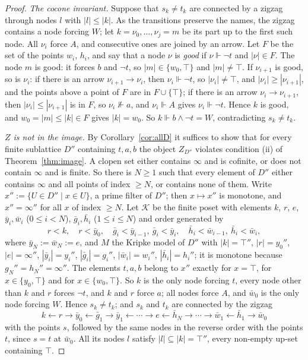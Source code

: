 \documentclass[11pt]{amsart}
\theoremstyle{definition}
\newcommand{\cK}{\mathcal K}
\begin{document}
\begin{proof}
\emph{The cocone invariant.} Suppose that $s_k\ne t_k$ are connected by
a zigzag through nodes $l$ with $|l|\le|k|$. As the transitions
preserve the names, the zigzag contains a node forcing $W$; let
$k=\nu_0,\dots,\nu_j=m$ be its part up to the first such node. All
$\nu_i$ force $A$, and consecutive ones are joined by an arrow. Let
$F$ be the set of the points $w_i$, $h_i$, and say that a node $\nu$
is \emph{good} if $\nu\Vdash\neg t$ and $|\nu|\in F$. The node $m$ is
good: it forces $b$ and $\neg t$, so $|m|\in\{w_0,\top\}$ and
$|m|\ne\top$. If $\nu_{i+1}$ is good, so is $\nu_i$: if there is an
arrow $\nu_{i+1}\to\nu_i$, then $\nu_i\Vdash\neg t$, so $|\nu_i|\ne
\top$, and $|\nu_i|\ge|\nu_{i+1}|$, and the points above a point of $F$
are in $F\cup\{\top\}$; if there is an arrow $\nu_i\to\nu_{i+1}$, then
$|\nu_i|\le|\nu_{i+1}|$ is in $F$, so $\nu_i\nVdash a$, and
$\nu_i\Vdash A$ gives $\nu_i\Vdash\neg t$. Hence $k$ is good, and
$w_0=|m|\le|k|\in F$ gives $|k|=w_0$. So $k\Vdash b\wedge\neg t=W$,
contradicting $s_k\ne t_k$.

\emph{$Z$ is not in the image.} By Corollary~\ref{cor:allD} it
suffices to show that for every finite sublattice $D''$ containing
$t,a,b$ the object $Z_{D''}$ violates condition (ii) of
Theorem~\ref{thm:image}. A clopen set either contains $\infty$ and is
cofinite, or does not contain $\infty$ and is finite. So there is
$N\ge1$ such that every element of $D''$ either contains $\infty$ and
all points of index $\ge N$, or contains none of them. Write
$x'':=\{U\in D''\mid x\in U\}$, a prime filter of $D''$; then
$x\mapsto x''$ is monotone, and $x''=\infty''$ for all $x$ of index
$\ge N$. Let $\cK$ be the finite poset with elements $k$, $r$, $e$,
$\bar y_i,\bar w_i$ ($0\le i<N$), $\bar g_i,\bar h_i$ ($1\le i\le N$)
and order generated by
\[
r<k,\quad r<\bar y_0,\quad\bar g_i<\bar y_{i-1},\ \bar g_i<\bar y_i,
\quad\bar h_i<\bar w_{i-1},\ \bar h_i<\bar w_i,
\]
where $\bar y_N:=\bar w_N:=e$, and $M$ the Kripke model of $D''$ with
$|k|=\top''$, $|r|=y_0''$, $|e|=\infty''$, $|\bar y_i|=y_i''$,
$|\bar g_i|=g_i''$, $|\bar w_i|=w_i''$, $|\bar h_i|=h_i''$; it is
monotone because $g_N''=h_N''=\infty''$. The elements $t,a,b$ belong to
$x''$ exactly for $x=\top$, for $x\in\{y_0,\top\}$ and for
$x\in\{w_0,\top\}$. So $k$ is the only node forcing $t$, every node
other than $k$ and $r$ forces $\neg t$, and $k$ and $r$ force $a$; all
nodes force $A$, and $\bar w_0$ is the only node forcing $W$. Hence
$s_k\ne t_k$; and $s_k$ and $t_k$ are connected by the zigzag
\[
k\leftarrow r\to\bar y_0\leftarrow\bar g_1\to\bar y_1\leftarrow\cdots
\to e\leftarrow\bar h_N\to\cdots\to\bar w_1\leftarrow\bar h_1\to
\bar w_0
\]
with the points $s$, followed by the same nodes in the reverse order
with the points $t$, since $s=t$ at $\bar w_0$. All its nodes $l$
satisfy $|l|\subseteq|k|=\top''$, every non-empty up-set containing
$\top$.
\end{proof}
\end{document}
